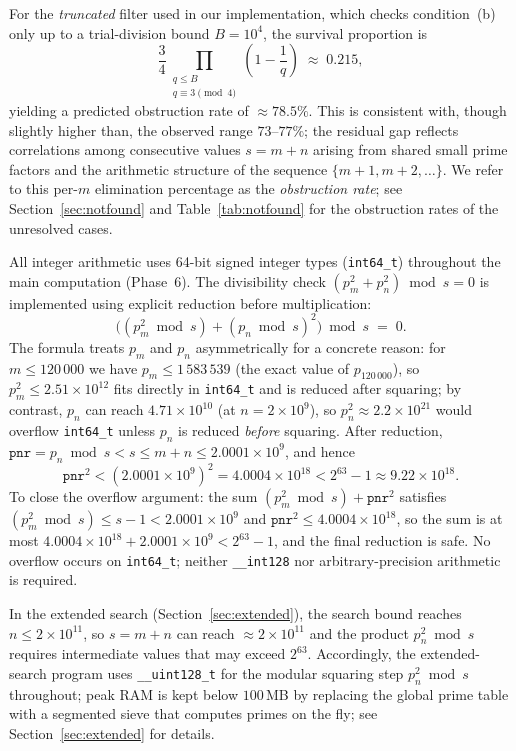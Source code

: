 \documentclass[pdflatex,sn-mathphys-num,Numbered]{sn-jnl}
\theoremstyle{thmstyleone}
\theoremstyle{thmstylethree}
\theoremstyle{thmstyletwo}
\numberwithin{equation}{section}
\begin{document}
For the \emph{truncated} filter used in our implementation,
which checks condition~(b) only up to a trial-division bound
$B = 10^4$, the survival proportion is
\[
\frac{3}{4} \prod_{\substack{q \leq B \\ q \equiv 3 \pmod{4}}}
\left(1 - \frac{1}{q}\right)
\;\approx\; 0.215,
\]
yielding a predicted obstruction rate of $\approx 78.5\%$.
This is consistent with, though slightly higher than, the
observed range $73$--$77\%$; the residual gap reflects
correlations among consecutive values $s = m+n$ arising from
shared small prime factors and the arithmetic structure of
the sequence $\{m+1, m+2, \ldots\}$.
We refer to this per-$m$ elimination percentage as the
\emph{obstruction rate}; see Section~\ref{sec:notfound}
and Table~\ref{tab:notfound} for the obstruction rates of the
unresolved cases.

All integer arithmetic uses 64-bit signed integer types
(\texttt{int64\_t}) throughout the main computation (Phase~6).
The divisibility check $(p_m^2 + p_n^2) \bmod s = 0$ is implemented
using explicit reduction before multiplication:
\[
\bigl((p_m^2 \bmod s) + (p_n \bmod s)^2\bigr) \bmod s \;=\; 0.
\]
The formula treats $p_m$ and $p_n$ asymmetrically for a concrete
reason: for $m \leq 120\,000$ we have $p_m \leq 1\,583\,539$
(the exact value of $p_{120\,000}$),
so $p_m^2 \leq 2.51 \times 10^{12}$ fits directly in \texttt{int64\_t}
and is reduced after squaring; by contrast, $p_n$ can reach
$4.71 \times 10^{10}$ (at $n = 2 \times 10^9$),
so $p_n^2 \approx 2.2 \times 10^{21}$ would
overflow \texttt{int64\_t} unless $p_n$ is reduced \emph{before}
squaring.
After reduction, $\mathtt{pnr} = p_n \bmod s < s \leq m + n \leq
2.0001 \times 10^9$, and hence
\[
\mathtt{pnr}^2 < (2.0001 \times 10^9)^2
= 4.0004 \times 10^{18}
< 2^{63} - 1 \approx 9.22 \times 10^{18}.
\]
To close the overflow argument: the sum
$(p_m^2 \bmod s) + \mathtt{pnr}^2$ satisfies
$(p_m^2 \bmod s) \leq s - 1 < 2.0001 \times 10^9$
and $\mathtt{pnr}^2 \leq 4.0004 \times 10^{18}$,
so the sum is at most $4.0004 \times 10^{18} + 2.0001 \times 10^9
< 2^{63} - 1$, and the final reduction is safe.
No overflow occurs on \texttt{int64\_t}; neither \texttt{\_\_int128}
nor arbitrary-precision arithmetic is required.

In the extended search (Section~\ref{sec:extended}), the search bound
reaches $n \leq 2 \times 10^{11}$, so
$s = m + n$ can reach $\approx 2 \times 10^{11}$ and the
product $p_n^2 \bmod s$ requires intermediate values that may exceed
$2^{63}$.
Accordingly, the extended-search program uses \texttt{\_\_uint128\_t}
for the modular squaring step $p_n^2 \bmod s$ throughout;
peak RAM is kept below $100$\,MB by replacing the global prime
table with a segmented sieve that computes primes on the fly;
see Section~\ref{sec:extended} for details.
\end{document}

